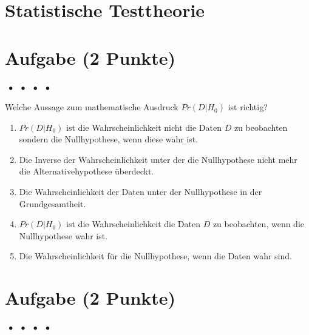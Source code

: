 \documentclass[a4paper, 9pt]{scrartcl}\usepackage[]{graphicx}\usepackage[]{xcolor}
\begin{document}
\section*{Statistische Testtheorie} 

\section{Aufgabe \hfill (2 Punkte)}

\ifcollection
\begin{flushright}
\tiny\vspace{-2Ex}
\textbf{\examinhaltstart}
\exammodulemathstat $\;\bullet$
\exammodulestat $\;\bullet$
\exammodulestatbbv $\;\bullet$
\exammodulestatversuch $\;\bullet$
\exammodulebiostat
\vspace{-1Ex}
\end{flushright}
\fi




Welche Aussage zum mathematische Ausdruck $Pr(D|H_0)$ ist richtig?



\begin{enumerate}
\item [\textbf{A} \msquare] $Pr(D|H_0)$ ist die Wahrscheinlichkeit nicht die Daten $D$ zu beobachten sondern die Nullhypothese, wenn diese wahr ist.
\item [\textbf{B} \msquare] Die Inverse der Wahrscheinlichkeit unter der die Nullhypothese nicht mehr die Alternativehypothese überdeckt.
\item [\textbf{C} \msquare] Die Wahrscheinlichkeit der Daten unter der Nullhypothese in der Grundgesamtheit.
\item [\textbf{D} \msquare] $Pr(D|H_0)$ ist die Wahrscheinlichkeit die Daten $D$ zu beobachten, wenn die Nullhypothese wahr ist.
\item [\textbf{E} \msquare] Die Wahrscheinlichkeit für die Nullhypothese, wenn die Daten wahr sind.
\end{enumerate} 

\section{Aufgabe \hfill (2 Punkte)}

\ifcollection
\begin{flushright}
\tiny\vspace{-2Ex}
\textbf{\examinhaltstart}
\exammodulemathstat $\;\bullet$
\exammodulestat $\;\bullet$
\exammodulestatbbv $\;\bullet$
\exammodulestatversuch $\;\bullet$
\exammodulebiostat
\vspace{-1Ex}
\end{flushright}
\fi
\end{document}
